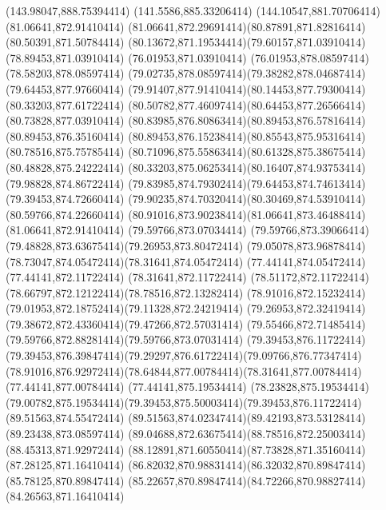 {{	\lineto(143.98047,888.75394414)
	\lineto(141.5586,885.33206414)
	\lineto(144.10547,881.70706414)
	\closepath
	\moveto(81.06641,872.91410414)
	\curveto(81.06641,872.29691414)(80.87891,871.82816414)(80.50391,871.50784414)
	\curveto(80.13672,871.19534414)(79.60157,871.03910414)(78.89453,871.03910414)
	\lineto(76.01953,871.03910414)
	\lineto(76.01953,878.08597414)
	\lineto(78.58203,878.08597414)
	\curveto(79.02735,878.08597414)(79.38282,878.04687414)(79.64453,877.97660414)
	\curveto(79.91407,877.91410414)(80.14453,877.79300414)(80.33203,877.61722414)
	\curveto(80.50782,877.46097414)(80.64453,877.26566414)(80.73828,877.03910414)
	\curveto(80.83985,876.80863414)(80.89453,876.57816414)(80.89453,876.35160414)
	\curveto(80.89453,876.15238414)(80.85543,875.95316414)(80.78516,875.75785414)
	\curveto(80.71096,875.55863414)(80.61328,875.38675414)(80.48828,875.24222414)
	\curveto(80.33203,875.06253414)(80.16407,874.93753414)(79.98828,874.86722414)
	\curveto(79.83985,874.79302414)(79.64453,874.74613414)(79.39453,874.72660414)
	\curveto(79.90235,874.70320414)(80.30469,874.53910414)(80.59766,874.22660414)
	\curveto(80.91016,873.90238414)(81.06641,873.46488414)(81.06641,872.91410414)
	\closepath
	\moveto(79.59766,873.07034414)
	\curveto(79.59766,873.39066414)(79.48828,873.63675414)(79.26953,873.80472414)
	\curveto(79.05078,873.96878414)(78.73047,874.05472414)(78.31641,874.05472414)
	\lineto(77.44141,874.05472414)
	\lineto(77.44141,872.11722414)
	\lineto(78.31641,872.11722414)
	\curveto(78.51172,872.11722414)(78.66797,872.12122414)(78.78516,872.13282414)
	\curveto(78.91016,872.15232414)(79.01953,872.18752414)(79.11328,872.24219414)
	\curveto(79.26953,872.32419414)(79.38672,872.43360414)(79.47266,872.57031414)
	\curveto(79.55466,872.71485414)(79.59766,872.88281414)(79.59766,873.07031414)
	\closepath
	\moveto(79.39453,876.11722414)
	\curveto(79.39453,876.39847414)(79.29297,876.61722414)(79.09766,876.77347414)
	\curveto(78.91016,876.92972414)(78.64844,877.00784414)(78.31641,877.00784414)
	\lineto(77.44141,877.00784414)
	\lineto(77.44141,875.19534414)
	\lineto(78.23828,875.19534414)
	\curveto(79.00782,875.19534414)(79.39453,875.50003414)(79.39453,876.11722414)
	\closepath
	\moveto(89.51563,874.55472414)
	\curveto(89.51563,874.02347414)(89.42193,873.53128414)(89.23438,873.08597414)
	\curveto(89.04688,872.63675414)(88.78516,872.25003414)(88.45313,871.92972414)
	\curveto(88.12891,871.60550414)(87.73828,871.35160414)(87.28125,871.16410414)
	\curveto(86.82032,870.98831414)(86.32032,870.89847414)(85.78125,870.89847414)
	\curveto(85.22657,870.89847414)(84.72266,870.98827414)(84.26563,871.16410414)
}}
